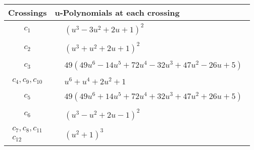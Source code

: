 \documentclass[1p]{elsarticle_modified}
\theoremstyle{definition}
\begin{document}
\begin{tabular}{m{50pt}|m{274pt}}
Crossings & \hspace{64pt}u-Polynomials at each crossing \\
\hline $$\begin{aligned}c_{1}\end{aligned}$$&$\begin{aligned}
&(u^3-3 u^2+2 u+1)^2
\end{aligned}$\\
\hline $$\begin{aligned}c_{2}\end{aligned}$$&$\begin{aligned}
&(u^3+u^2+2 u+1)^2
\end{aligned}$\\
\hline $$\begin{aligned}c_{3}\end{aligned}$$&$\begin{aligned}
&49(49 u^6-14 u^5+72 u^4-32 u^3+47 u^2-26 u+5)
\end{aligned}$\\
\hline $$\begin{aligned}c_{4},c_{9},c_{10}\end{aligned}$$&$\begin{aligned}
&u^6+u^4+2 u^2+1
\end{aligned}$\\
\hline $$\begin{aligned}c_{5}\end{aligned}$$&$\begin{aligned}
&49(49 u^6+14 u^5+72 u^4+32 u^3+47 u^2+26 u+5)
\end{aligned}$\\
\hline $$\begin{aligned}c_{6}\end{aligned}$$&$\begin{aligned}
&(u^3- u^2+2 u-1)^2
\end{aligned}$\\
\hline $$\begin{aligned}c_{7},c_{8},c_{11}\\c_{12}\end{aligned}$$&$\begin{aligned}
&(u^2+1)^3
\end{aligned}$\\
\hline
\end{tabular}\\~\\
\newpage\renewcommand{\arraystretch}{1}
\end{document}
